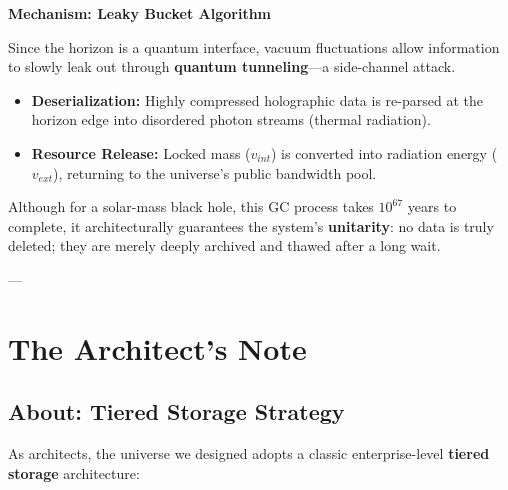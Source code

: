 \textbf{Mechanism: Leaky Bucket Algorithm}

Since the horizon is a quantum interface, vacuum fluctuations allow information to slowly leak out through \textbf{quantum tunneling}---a side-channel attack.

\begin{itemize}
\item \textbf{Deserialization:} Highly compressed holographic data is re-parsed at the horizon edge into disordered photon streams (thermal radiation).

\item \textbf{Resource Release:} Locked mass (\textbf{$v_{int}$}) is converted into radiation energy (\textbf{$v_{ext}$}), returning to the universe's public bandwidth pool.
\end{itemize}

Although for a solar-mass black hole, this GC process takes \textbf{$10^{67}$} years to complete, it architecturally guarantees the system's \textbf{unitarity}: no data is truly deleted; they are merely deeply archived and thawed after a long wait.

---

\section{The Architect's Note}

\subsection{About: Tiered Storage Strategy}

As architects, the universe we designed adopts a classic enterprise-level \textbf{tiered storage} architecture:

